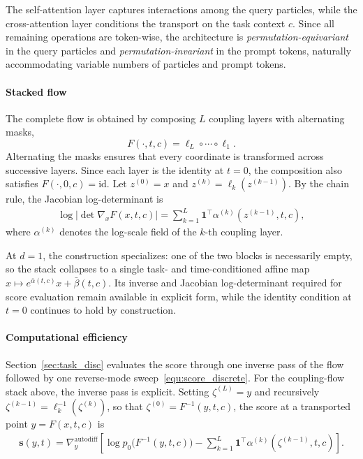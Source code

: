 \documentclass[preprint]{elsarticle}
\begin{document}
The self-attention layer captures interactions among the query particles, while the cross-attention layer conditions the transport on the task context $c$. Since all remaining operations are token-wise, the architecture is \emph{permutation-equivariant} in the query particles and \emph{permutation-invariant} in the prompt tokens, naturally accommodating variable numbers of particles and prompt tokens.

\paragraph{Stacked flow}
The complete flow is obtained by composing $L$ coupling layers with alternating masks,
\[
F(\cdot,t,c)=\ell_L\circ\cdots\circ\ell_1.
\]
Alternating the masks ensures that every coordinate is transformed across successive layers. Since each layer is the identity at $t=0$, the composition also satisfies $F(\cdot,0,c)=\mathrm{id}$. Let $z^{(0)}=x$ and $z^{(k)}=\ell_k(z^{(k-1)})$. By the chain rule, the Jacobian log-determinant is
\begin{align}
\log\bigl|\det\nabla_xF(x,t,c)\bigr|
=
\sum_{k=1}^{L}
\mathbf1^\top
\alpha^{(k)}\!\left(z^{(k-1)},t,c\right),
\label{equ:stack_logdet}
\end{align}
where $\alpha^{(k)}$ denotes the log-scale field of the $k$-th coupling layer.

At $d=1$, the construction specializes: one of the two blocks is necessarily empty, so the stack collapses to a single task- and time-conditioned affine map $x\mapsto e^{\bar\alpha(t,c)}x + \bar\beta(t,c)$. Its inverse and Jacobian log-determinant required for score evaluation remain available in explicit form, while the identity condition at $t=0$ continues to hold by construction.

\paragraph{Computational efficiency}
Section~\ref{sec:task_disc} evaluates the score through one inverse pass of the flow followed by one reverse-mode sweep~\eqref{equ:score_discrete}. For the coupling-flow stack above, the inverse pass is explicit. Setting $\zeta^{(L)}=y$ and recursively $\zeta^{(k-1)}=\ell_k^{-1}(\zeta^{(k)})$, so that $\zeta^{(0)}=F^{-1}(y,t,c)$, the score at a transported point $y=F(x,t,c)$ is
\begin{align}
\mathbf{s}(y,t)
=
\nabla_y^{\mathrm{autodiff}}
\left[
\log p_0\bigl(F^{-1}(y,t,c)\bigr)
-
\sum_{k=1}^{L}
\mathbf1^\top
\alpha^{(k)}\!\left(\zeta^{(k-1)},t,c\right)
\right].
\label{equ:score_inverse}
\end{align}
\end{document}

